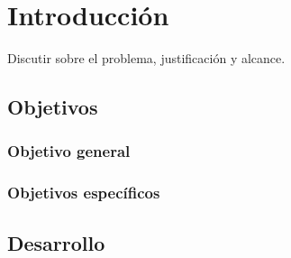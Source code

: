 \chapter{Introducción}

Discutir sobre el problema, justificación y alcance.

\section{Objetivos}

\subsection{Objetivo general}

\subsection{Objetivos específicos}

\section{Desarrollo}

